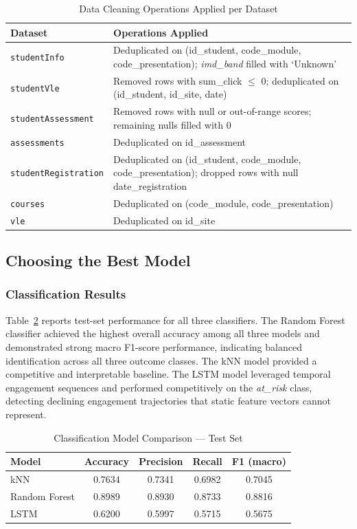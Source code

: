 \documentclass[conference]{IEEEtran}
\begin{document}
\begin{table}[ht]
\centering
\caption{Data Cleaning Operations Applied per Dataset}
\label{tab:cleaning}
\begin{tabularx}{\columnwidth}{l X}
\toprule
\textbf{Dataset} & \textbf{Operations Applied} \\ \midrule
\texttt{studentInfo} & Deduplicated on (id\_student, code\_module, code\_presentation); \textit{imd\_band} filled with `Unknown' \\
\texttt{studentVle} & Removed rows with sum\_click $\leq$ 0; deduplicated on (id\_student, id\_site, date) \\
\texttt{studentAssessment} & Removed rows with null or out-of-range scores; remaining nulls filled with 0 \\
\texttt{assessments} & Deduplicated on id\_assessment \\
\texttt{studentRegistration} & Deduplicated on (id\_student, code\_module, code\_presentation); dropped rows with null date\_registration \\
\texttt{courses} & Deduplicated on (code\_module, code\_presentation) \\
\texttt{vle} & Deduplicated on id\_site \\ \bottomrule
\end{tabularx}
\end{table}

\subsection{Choosing the Best Model}

\subsubsection{Classification Results}
Table~\ref{tab:clf_results} reports test-set performance for all three classifiers. The Random Forest classifier achieved the highest overall accuracy among all three models and demonstrated strong macro F1-score performance, indicating balanced identification across all three outcome classes. The kNN model provided a competitive and interpretable baseline. The LSTM model leveraged temporal engagement sequences and performed competitively on the \textit{at\_risk} class, detecting declining engagement trajectories that static feature vectors cannot represent.

\begin{table}[ht]
\centering
\caption{Classification Model Comparison — Test Set}
\label{tab:clf_results}
\begin{tabular}{lcccc}
\toprule
\textbf{Model} & \textbf{Accuracy} & \textbf{Precision} & \textbf{Recall} & \textbf{F1 (macro)} \\ \midrule
kNN            & 0.7634 & 0.7341 & 0.6982 & 0.7045  \\
Random Forest  & 0.8989 & 0.8930 & 0.8733 & 0.8816 \\
LSTM           & 0.6200 & 0.5997 & 0.5715 & 0.5675 \\ \bottomrule
\end{tabular}
\end{table}
\end{document}
